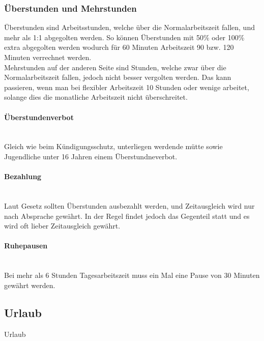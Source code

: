 \documentclass{article}
\newcommand{\paragraphlb}[1]{\paragraph{#1}\mbox{}\\}
\begin{document}
	\subsubsection{Überstunden und Mehrstunden}
	Überstunden sind Arbeitsstunden, welche über die Normalarbeitszeit fallen, und mehr als 1:1 abgegolten werden. So können Überstunden mit 50\% oder 100\% extra abgegolten werden wodurch für 60 Minuten Arbeitszeit 90 bzw. 120 Minuten verrechnet werden. \\
	Mehrstunden auf der anderen Seite sind Stunden, welche zwar über die Normalarbeitszeit fallen, jedoch nicht besser vergolten werden. Das kann passieren, wenn man bei flexibler Arbeitszeit 10 Stunden oder wenige arbeitet, solange dies die monatliche Arbeitszeit nicht überschreitet.
	\paragraphlb{Überstundenverbot}
	Gleich wie beim Kündigungsschutz, unterliegen werdende mütte sowie Jugendliche unter 16 Jahren einem Überstundneverbot.
	\paragraphlb{Bezahlung}
	Laut Gesetz sollten Überstunden ausbezahlt werden, und Zeitausgleich wird nur nach Absprache gewährt. In der Regel findet jedoch das Gegenteil statt und es wird oft lieber Zeitausgleich gewährt.
	\paragraphlb{Ruhepausen}
	Bei mehr als 6 Stunden Tagesarbeitszeit muss ein Mal eine Pause von 30 Minuten gewährt werden.
	\subsection{Urlaub}
	Urlaub



















  
\end{document}
